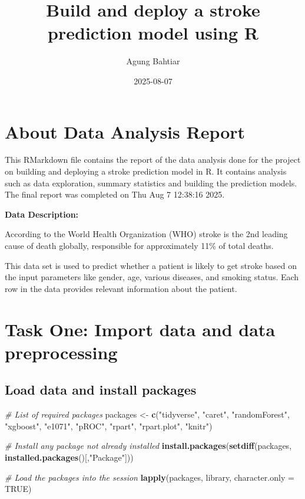\documentclass[
]{article}
\title{Build and deploy a stroke prediction model using R}
\author{Agung Bahtiar}
\date{2025-08-07}
\newenvironment{Shaded}{\begin{snugshade}}{\end{snugshade}}
\newcommand{\AttributeTok}[1]{\textcolor[rgb]{0.13,0.29,0.53}{#1}}
\newcommand{\CommentTok}[1]{\textcolor[rgb]{0.56,0.35,0.01}{\textit{#1}}}
\newcommand{\ConstantTok}[1]{\textcolor[rgb]{0.56,0.35,0.01}{#1}}
\newcommand{\FunctionTok}[1]{\textcolor[rgb]{0.13,0.29,0.53}{\textbf{#1}}}
\newcommand{\NormalTok}[1]{#1}
\newcommand{\OtherTok}[1]{\textcolor[rgb]{0.56,0.35,0.01}{#1}}
\newcommand{\StringTok}[1]{\textcolor[rgb]{0.31,0.60,0.02}{#1}}
\begin{document}
\maketitle

\section{About Data Analysis Report}\label{about-data-analysis-report}

This RMarkdown file contains the report of the data analysis done for
the project on building and deploying a stroke prediction model in R. It
contains analysis such as data exploration, summary statistics and
building the prediction models. The final report was completed on Thu
Aug 7 12:38:16 2025.

\textbf{Data Description:}

According to the World Health Organization (WHO) stroke is the 2nd
leading cause of death globally, responsible for approximately 11\% of
total deaths.

This data set is used to predict whether a patient is likely to get
stroke based on the input parameters like gender, age, various diseases,
and smoking status. Each row in the data provides relevant information
about the patient.

\section{Task One: Import data and data
preprocessing}\label{task-one-import-data-and-data-preprocessing}

\subsection{Load data and install
packages}\label{load-data-and-install-packages}

\begin{Shaded}
\begin{Highlighting}[]
\CommentTok{\# List of required packages}
\NormalTok{packages }\OtherTok{\textless{}{-}} \FunctionTok{c}\NormalTok{(}\StringTok{"tidyverse"}\NormalTok{, }\StringTok{"caret"}\NormalTok{, }\StringTok{"randomForest"}\NormalTok{, }\StringTok{"xgboost"}\NormalTok{, }\StringTok{"e1071"}\NormalTok{, }\StringTok{"pROC"}\NormalTok{, }\StringTok{"rpart"}\NormalTok{, }\StringTok{"rpart.plot"}\NormalTok{, }\StringTok{"knitr"}\NormalTok{)}

\CommentTok{\# Install any package not already installed}
\FunctionTok{install.packages}\NormalTok{(}\FunctionTok{setdiff}\NormalTok{(packages, }\FunctionTok{installed.packages}\NormalTok{()[,}\StringTok{"Package"}\NormalTok{]))}

\CommentTok{\# Load the packages into the session}
\FunctionTok{lapply}\NormalTok{(packages, library, }\AttributeTok{character.only =} \ConstantTok{TRUE}\NormalTok{)}
\end{Highlighting}
\end{Shaded}
\end{document}
